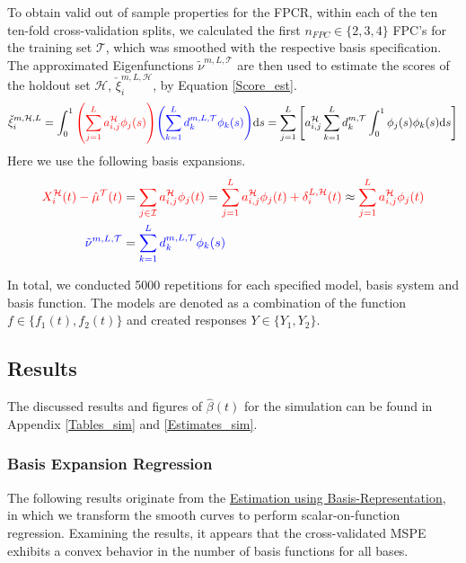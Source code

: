\documentclass[11pt,twoside,a4paper]{article}
\begin{document}
		To obtain valid out of sample properties for the FPCR, within each of the ten ten-fold cross-validation splits, we calculated the first $n_{FPC} \in \{2,3,4\}$ FPC's for the training set $\mathcal{T}$, which was smoothed with the respective basis specification. The approximated Eigenfunctions $\tilde{\nu}^{m, L, \mathcal{T}}$ are then used to estimate the scores of the holdout set $\mathcal{H}$, $\check{\xi}_{i}^{m, L, \mathcal{H}}$,  by Equation \ref{Score_est}.
		\begin{equation}\label{Score_est}
			\check{\xi}_{i}^{m, \mathcal{H},L}
			= \int_{0}^{1} {\color{red}\left(\sum_{j = 1}^{L} a_{i,j}^{\mathcal{H}} \phi_j(s)\right)} {\color{blue}\left(\sum_{k = 1}^{L} d_{k}^{m, L, \mathcal{T}} \phi_{k}(s)\right)} \mathrm{d}s
		    = \sum_{j = 1}^{L} \left[ a_{i,j}^{\mathcal{H}}\sum_{k = 1}^{L}  d_{k}^{m, \mathcal{T}} \int_{0}^{1} \phi_j(s) \phi_{k}(s)\mathrm{d}s\right]
		\end{equation}
		Here we use the following basis expansions.
		\begin{equation}
			\begin{split}
				{\color{red} X_{i}^{\mathcal{H}}(t) - \hat{\mu}^{\mathcal{T}}(t)} 
				&= {\color{red}\sum_{j \in \mathcal{I}} a_{i,j}^{\mathcal{H}} \phi_j(t)}
				= {\color{red}\sum_{j = 1}^{L} a_{i,j}^{\mathcal{H}} \phi_j(t) + \delta_{i}^{L, \mathcal{H}}(t)}
				\approx {\color{red}\sum_{j = 1}^{L} a_{i,j}^{\mathcal{H}} \phi_j(t)} \\
				{\color{blue}\tilde{\nu}^{m, L, \mathcal{T}} } &= {\color{blue}\sum_{k = 1}^{L} d_{k}^{m, L, \mathcal{T}} \phi_{k}(s)}
			\end{split}
		\end{equation}
		
		In total, we conducted 5000 repetitions for each specified model, basis system and basis function. The models are denoted as a combination of the function $f \in \{f_1(t), f_2(t)\}$	and created responses $Y \in \{Y_1, Y_2\}$.
		
	\subsection{Results}	
	The discussed results and figures of $\hat{\beta}(t)$ for the simulation can be found in Appendix \ref{Tables_sim} and \ref{Estimates_sim}.
	 
	\subsubsection{Basis Expansion Regression}
	The following results originate from the \hyperref[basis_exp_transf]{Estimation using Basis-Representation}, in which we transform the smooth curves to perform scalar-on-function regression. Examining the results, it appears that the cross-validated MSPE exhibits a convex behavior in the number of basis functions for all bases.
	
\end{document}
